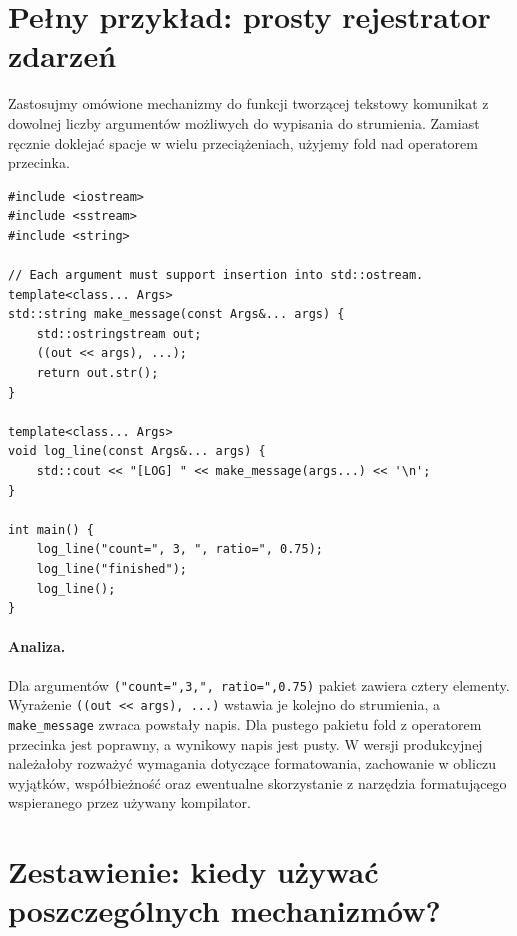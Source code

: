 \section{Pełny przykład: prosty rejestrator zdarzeń}
\label{sec:variadic-projekt}

Zastosujmy omówione mechanizmy do funkcji tworzącej tekstowy
komunikat z dowolnej liczby argumentów możliwych do
wypisania do strumienia. Zamiast ręcznie doklejać spacje
w wielu przeciążeniach, użyjemy fold nad operatorem przecinka.

\begin{lstlisting}
#include <iostream>
#include <sstream>
#include <string>

// Each argument must support insertion into std::ostream.
template<class... Args>
std::string make_message(const Args&... args) {
    std::ostringstream out;
    ((out << args), ...);
    return out.str();
}

template<class... Args>
void log_line(const Args&... args) {
    std::cout << "[LOG] " << make_message(args...) << '\n';
}

int main() {
    log_line("count=", 3, ", ratio=", 0.75);
    log_line("finished");
    log_line();
}
\end{lstlisting}

\paragraph{Analiza.}
Dla argumentów \texttt{("count=",3,", ratio=",0.75)}
pakiet zawiera cztery elementy. Wyrażenie
\texttt{((out << args), ...)} wstawia je kolejno do strumienia,
a \texttt{make\_message} zwraca powstały napis. Dla
pustego pakietu fold z operatorem przecinka jest poprawny,
a wynikowy napis jest pusty. W wersji produkcyjnej należałoby
rozważyć wymagania dotyczące formatowania, zachowanie w
obliczu wyjątków, współbieżność oraz ewentualne skorzystanie
z narzędzia formatującego wspieranego przez używany kompilator.

\section{Zestawienie: kiedy używać poszczególnych mechanizmów?}

